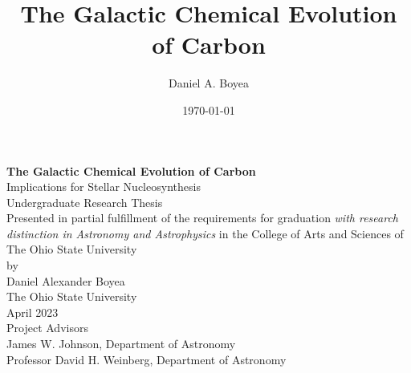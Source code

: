\documentclass[12pt,oneside,letterpaper]{report}
\title{The Galactic Chemical Evolution of Carbon}
\author{Daniel A. Boyea}
\date{\today}
\begin{document}


\begin{titlepage}
   \begin{center}
       \textbf{The Galactic Chemical Evolution of Carbon}\\
       Implications for Stellar Nucleosynthesis\\
       \vspace*{3\baselineskip}
        Undergraduate Research Thesis\\
       \vspace*{3\baselineskip}
    Presented in partial fulfillment of the requirements for graduation \textit{with research distinction in Astronomy and Astrophysics} in the College of Arts and Sciences of The Ohio State University\\
       \vspace*{3\baselineskip}
        by\\
       \vspace*{3\baselineskip}
       {Daniel Alexander Boyea}\\
       \vspace*{3\baselineskip}
       The Ohio State University\\
       April 2023\\
       \vspace*{3\baselineskip}
       Project Advisors\\
       James W. Johnson, Department of Astronomy \\
       Professor David H. Weinberg, Department of Astronomy 
       \vfill
   \end{center}
\end{titlepage}



\end{document}
